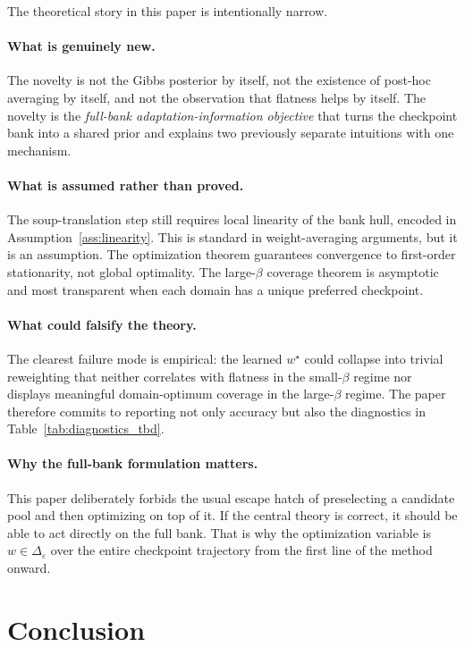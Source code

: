 \documentclass{article}
\newcommand{\simplex}{\Delta}
\newcommand{\epssimplex}{\simplex_{\varepsilon}}
\begin{document}
The theoretical story in this paper is intentionally narrow.

\paragraph{What is genuinely new.}
The novelty is not the Gibbs posterior by itself, not the existence of post-hoc averaging by itself, and not the observation that flatness helps by itself. The novelty is the \emph{full-bank adaptation-information objective} that turns the checkpoint bank into a shared prior and explains two previously separate intuitions with one mechanism.

\paragraph{What is assumed rather than proved.}
The soup-translation step still requires local linearity of the bank hull, encoded in Assumption~\ref{ass:linearity}. This is standard in weight-averaging arguments, but it is an assumption. The optimization theorem guarantees convergence to first-order stationarity, not global optimality. The large-\(\beta\) coverage theorem is asymptotic and most transparent when each domain has a unique preferred checkpoint.

\paragraph{What could falsify the theory.}
The clearest failure mode is empirical: the learned \(w^\star\) could collapse into trivial reweighting that neither correlates with flatness in the small-\(\beta\) regime nor displays meaningful domain-optimum coverage in the large-\(\beta\) regime. The paper therefore commits to reporting not only accuracy but also the diagnostics in Table~\ref{tab:diagnostics_tbd}.

\paragraph{Why the full-bank formulation matters.}
This paper deliberately forbids the usual escape hatch of preselecting a candidate pool and then optimizing on top of it. If the central theory is correct, it should be able to act directly on the full bank. That is why the optimization variable is \(w \in \epssimplex\) over the entire checkpoint trajectory from the first line of the method onward.

\section{Conclusion}
\end{document}
